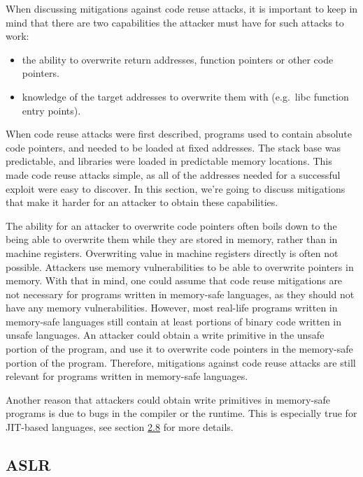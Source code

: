 \documentclass[
  a4paper,
]{report}
\providecommand{\tightlist}{%
  \setlength{\itemsep}{0pt}\setlength{\parskip}{0pt}}
\begin{document}
When discussing mitigations against code reuse attacks, it is important
to keep in mind that there are two capabilities the attacker must have
for such attacks to work:

\begin{itemize}
\tightlist
\item
  the ability to overwrite return addresses, function pointers or other
  code pointers.
\item
  knowledge of the target addresses to overwrite them with (e.g.~libc
  function entry points).
\end{itemize}

When code reuse attacks were first described, programs used to contain
absolute code pointers, and needed to be loaded at fixed addresses. The
stack base was predictable, and libraries were loaded in predictable
memory locations. This made code reuse attacks simple, as all of the
addresses needed for a successful exploit were easy to discover. In this
section, we're going to discuss mitigations that make it harder for an
attacker to obtain these capabilities.

The ability for an attacker to overwrite code pointers often boils down
to the being able to overwrite them while they are stored in memory,
rather than in machine registers. Overwriting value in
machine registers directly is often not possible. Attackers use memory
vulnerabilities to be able to overwrite
pointers in memory. With that in mind, one could assume that code reuse
mitigations are not necessary for programs written in memory-safe
languages, as they should not have any memory vulnerabilities. However,
most real-life programs written in memory-safe languages still contain
at least portions of binary code written in unsafe languages. An
attacker could obtain a write primitive in the unsafe portion of the
program, and use it to overwrite code pointers in the memory-safe
portion of the program. Therefore, mitigations against code reuse
attacks are still relevant for programs written in memory-safe
languages.

Another reason that attackers could obtain write primitives in
memory-safe programs is due to bugs in the compiler or the runtime. This
is especially true for JIT-based languages, see section
\hyperref[sec:jit-compiler-vulnerabilities]{2.8} for more details.

\subsection{ASLR}\label{aslr}
\end{document}
